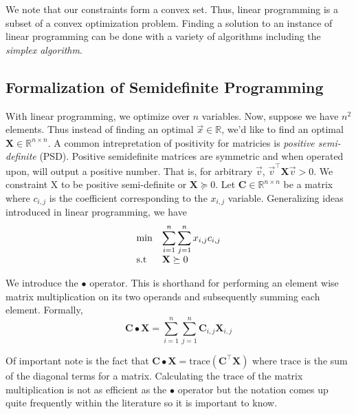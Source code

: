 \documentclass{article}
\begin{document}
We note that our constraints form a convex set.
Thus, linear programming is a subset of a convex optimization problem.
Finding a solution to an instance of linear programming can be done with a variety of algorithms including the \emph{simplex algorithm}.

\subsection{Formalization of Semidefinite Programming}
With linear programming, we optimize over  \( n \) variables. Now, suppose we have \( n^2 \) elements. 
Thus instead of finding an optimal \( \vec{x} \in \mathbb{R} \), we'd like to find an optimal 
\( \mathbf{X} \in \mathbb{R}^{n \times n} \).
A common intrepretation of positivity for matricies is \emph{positive semi-definite} (PSD). 
Positive semidefinite matrices are symmetric and when operated upon, will output a positive number. That is, for 
arbitrary $\vec{v}$, $\vec{v}^\top\mathbf{X}\vec{v} > 0$.
We constraint X to be
positive semi-definite or \( \mathbf{X} \succeq 0 \).
Let \( \mathbf{C} \in \mathbb{R}^{n \times n}\) be a matrix where $c_{i,j}$ is the coefficient corresponding 
to the \( x_{i, j} \) variable. Generalizing ideas introduced in linear programming, we have
\begin{align*}
  \begin{array}{ll@{}ll}
  \min & \displaystyle\sum\limits_{i=1}^{n}\sum\limits_{j=1}^{n} x_{i, j} c_{i , j} &\\
  \text{s.t} & \mathbf{X} \succeq 0 
  \end{array}
\end{align*}

We introduce the \( \bullet \) operator. This is shorthand for performing an element wise matrix multiplication
on its two operands and subsequently summing each element. Formally,
\[
  \mathbf{C} \bullet \mathbf{X} = \sum_{i = 1}^n \sum_{j = 1}^n \mathbf{C}_{i, j} \mathbf{X}_{i, j}
\]

Of important note is the fact that \( \mathbf{C} \bullet \mathbf{X} = \text{trace}(\mathbf{C}^\top \mathbf{X}) \) where \( \text{trace} \) is the sum of the diagonal terms for a matrix. Calculating the \( \text{trace} \) of the matrix multiplication is not as efficient as the \( \bullet \) operator but the notation comes up quite frequently within the literature so it is important to know.
\end{document}
